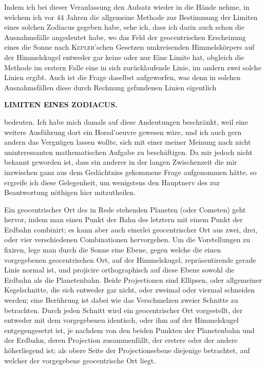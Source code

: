 Indem ich bei dieser Veranlassung den Aufsatz wieder in die Hände nehme, in welchem ich vor 44 Jahren die allgemeine Methode zur Bestimmung der Limiten eines solchen Zodiacus gegeben habe, sehe ich, dass ich darin auch schon die Ausnahmsfälle angedeutet habe, wo das Feld der geocentrischen Erscheinung eines die Sonne nach \textsc{Kepler}'schen Gesetzen umkreisenden Himmelskörpers auf der Himmelskugel entweder gar keine oder nur Eine Limite hat, obgleich die Methode im erstern Falle eine in sich zurücklaufende Linie, im andern zwei solche Linien ergibt. Auch ist die Frage daselbst aufgeworfen, was denn in solchen Ausnahmsfällen diese durch Rechnung gefundenen Linien eigentlich
\clearpage
\thispagestyle{empty}
\noindent{}%
\makebox[12mm][l]{}%
\parbox[t]{\dimexpr\linewidth-24mm\relax}{\centering\footnotesize\bfseries LIMITEN EINES ZODIACUS.\par}%
\par\nobreak\medskip
\noindent bedeuten. Ich habe mich damals auf diese Andeutungen beschränkt, weil eine weitere Ausführung dort ein Horsd'oeuvre gewesen wäre, und ich auch gern andern das Vergnügen lassen wollte, sich mit einer meiner Meinung nach nicht uninteressanten mathematischen Aufgabe zu beschäftigen. Da mir jedoch nicht bekannt geworden ist, dass ein anderer in der langen Zwischenzeit die mir inzwischen ganz aus dem Gedächtniss gekommene Frage aufgenommen hätte, so ergreife ich diese Gelegenheit, um wenigstens den Hauptnerv des zur Beantwortung nöthigen hier mitzutheilen.

Ein geocentrischer Ort des in Rede stehenden Planeten (oder Cometen) geht hervor, indem man einen Punkt der Bahn des letztern mit einem Punkt der Erdbahn combinirt; es kann aber auch einerlei geocentrischer Ort aus zwei, drei, oder vier verschiedenen Combinationen hervorgehen. Um die Vorstellungen zu fixiren, lege man durch die Sonne eine Ebene, gegen welche die einen vorgegebenen geocentrischen Ort, auf der Himmelskugel, repräsentirende gerade Linie normal ist, und projicire orthographisch auf diese Ebene sowohl die Erdbahn als die Planetenbahn. Beide Projectionen sind Ellipsen, oder allgemeiner Kegelschnitte, die sich entweder gar nicht, oder zweimal oder viermal schneiden werden; eine Berührung ist dabei wie das Verschmelzen zweier Schnitte zu betrachten. Durch jeden Schnitt wird ein geocentrischer Ort vorgestellt, der entweder mit dem vorgegebenen identisch, oder ihm auf der Himmelskugel entgegengesetzt ist, je nachdem von den beiden Punkten der Planetenbahn und der Erdbahn, deren Projection zusammenfällt, der erstere oder der andere höherliegend ist; als obere Seite der Projectionsebene diejenige betrachtet, auf welcher der vorgegebene geocentrische Ort liegt.

